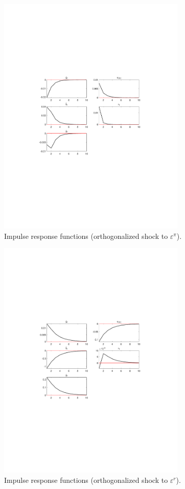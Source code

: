 \begin{figure}[H]
\centering 
\includegraphics[width=0.80\textwidth]{monetary/graphs/monetary_IRF_eps_pi}
\caption{Impulse response functions (orthogonalized shock to ${\varepsilon^{\pi}}$).}
\label{Fig:IRF:eps_pi}
\end{figure}
 
\begin{figure}[H]
\centering 
\includegraphics[width=0.80\textwidth]{monetary/graphs/monetary_IRF_eps_r}
\caption{Impulse response functions (orthogonalized shock to ${\varepsilon^{r}}$).}
\label{Fig:IRF:eps_r}
\end{figure}
 
